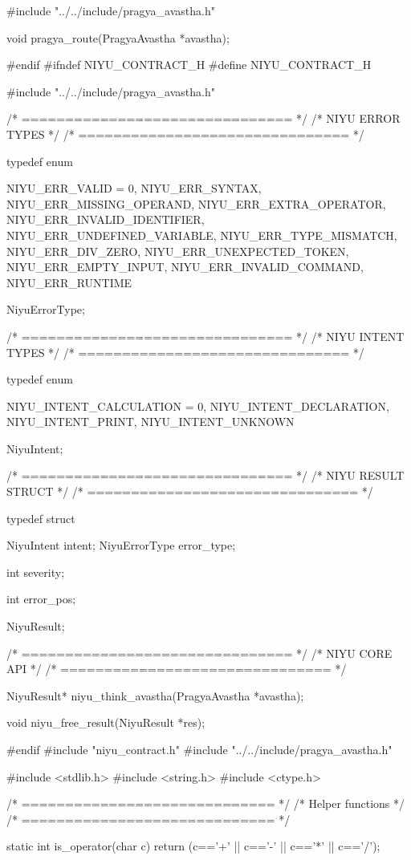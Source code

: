 \documentclass{article}
\begin{document}
#include "../../include/pragya_avastha.h"

void pragya_route(PragyaAvastha *avastha);

#endif
#ifndef NIYU_CONTRACT_H
#define NIYU_CONTRACT_H

#include "../../include/pragya_avastha.h"

/* =============================== */
/* NIYU ERROR TYPES                */
/* =============================== */

typedef enum {

    NIYU_ERR_VALID = 0,
    NIYU_ERR_SYNTAX,
    NIYU_ERR_MISSING_OPERAND,
    NIYU_ERR_EXTRA_OPERATOR,
    NIYU_ERR_INVALID_IDENTIFIER,
    NIYU_ERR_UNDEFINED_VARIABLE,
    NIYU_ERR_TYPE_MISMATCH,
    NIYU_ERR_DIV_ZERO,
    NIYU_ERR_UNEXPECTED_TOKEN,
    NIYU_ERR_EMPTY_INPUT,
    NIYU_ERR_INVALID_COMMAND,
    NIYU_ERR_RUNTIME

} NiyuErrorType;


/* =============================== */
/* NIYU INTENT TYPES               */
/* =============================== */

typedef enum {

    NIYU_INTENT_CALCULATION = 0,
    NIYU_INTENT_DECLARATION,
    NIYU_INTENT_PRINT,
    NIYU_INTENT_UNKNOWN

} NiyuIntent;


/* =============================== */
/* NIYU RESULT STRUCT              */
/* =============================== */

typedef struct {

    NiyuIntent intent;
    NiyuErrorType error_type;

    int severity;

    int error_pos;

} NiyuResult;


/* =============================== */
/* NIYU CORE API                   */
/* =============================== */

NiyuResult* niyu_think_avastha(PragyaAvastha *avastha);

void niyu_free_result(NiyuResult *res);

#endif
#include "niyu_contract.h"
#include "../../include/pragya_avastha.h"

#include <stdlib.h>
#include <string.h>
#include <ctype.h>

/* ============================= */
/* Helper functions              */
/* ============================= */

static int is_operator(char c)
{
    return (c=='+' || c=='-' || c=='*' || c=='/');
}
\end{document}
